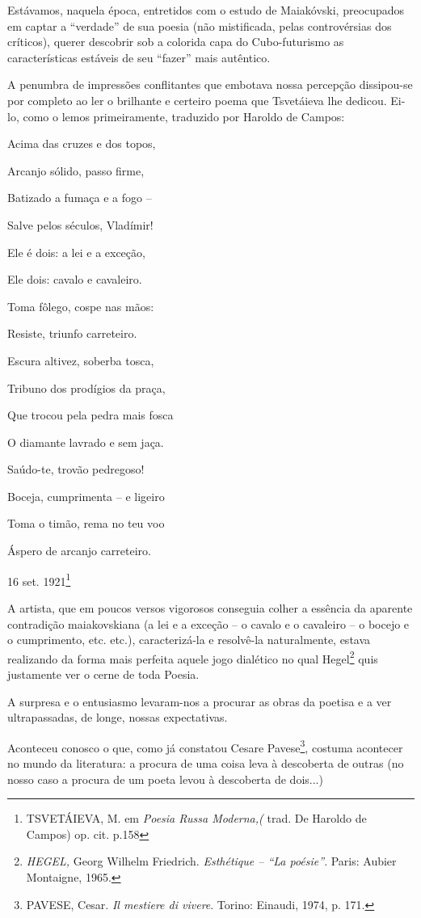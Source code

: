 Estávamos, naquela época, entretidos com o estudo de Maiakóvski,
preocupados em captar a ``verdade'' de sua poesia (não mistificada,
pelas controvérsias dos críticos), querer descobrir sob a colorida capa
do Cubo-futurismo as características estáveis de seu ``fazer'' mais
autêntico.

A penumbra de impressões conflitantes que embotava nossa percepção
dissipou-se por completo ao ler o brilhante e certeiro poema que
Tsvetáieva lhe dedicou. Ei-lo, como o lemos primeiramente, traduzido por
Haroldo de Campos:

Acima das cruzes e dos topos,

Arcanjo sólido, passo firme,

Batizado a fumaça e a fogo --

Salve pelos séculos, Vladímir!

Ele é dois: a lei e a exceção,

Ele dois: cavalo e cavaleiro.

Toma fôlego, cospe nas mãos:

Resiste, triunfo carreteiro.

Escura altivez, soberba tosca,

Tribuno dos prodígios da praça,

Que trocou pela pedra mais fosca

O diamante lavrado e sem jaça.

Saúdo-te, trovão pedregoso!

Boceja, cumprimenta -- e ligeiro

Toma o timão, rema no teu voo

Áspero de arcanjo carreteiro.

16 set. 1921\footnote{TSVETÁIEVA, M. em \emph{Poesia Russa Moderna,(}
  trad. De Haroldo de Campos) op. cit. p.158}

A artista, que em poucos versos vigorosos conseguia colher a essência da
aparente contradição maiakovskiana (a lei e a exceção -- o cavalo e o
cavaleiro -- o bocejo e o cumprimento, etc. etc.), caracterizá-la e
resolvê-la naturalmente, estava realizando da forma mais perfeita aquele
jogo dialético no qual Hegel\footnote{\emph{HEGEL,} Georg Wilhelm
  Friedrich. \emph{Esthétique -- ``La poésie''}. Paris: Aubier
  Montaigne, 1965.} quis justamente ver o cerne de toda Poesia.

A surpresa e o entusiasmo levaram-nos a procurar as obras da poetisa e a
ver ultrapassadas, de longe, nossas expectativas.

Aconteceu conosco o que, como já constatou Cesare Pavese\footnote{PAVESE,
  Cesar. \emph{Il mestiere di vivere}. Torino: Einaudi, 1974, p. 171.},
costuma acontecer no mundo da literatura: a procura de uma coisa leva à
descoberta de outras (no nosso caso a procura de um poeta levou à
descoberta de dois...)

